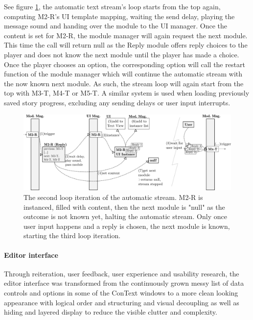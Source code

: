 See figure \ref{fig:loop2}, the automatic text stream's loop starts from the top again, computing M2-R's UI template mapping, waiting the send delay, playing the message sound and handing over the module to the UI manager. Once the content is set for M2-R, the module manager will again request the next module. This time the call will return null as the Reply module offers reply choices to the player and does not know the next module until the player has made a choice. Once the player chooses an option, the corresponding option will call the restart function of the module manager which will continue the automatic stream with the now known next module. 
As such, the stream loop will again start from the top with M3-T, M4-T or M5-T. 
A similar system is used when loading previously saved story progress, excluding any sending delays or user input interrupts. 

\begin{figure}[H]
\centering
\includegraphics[width=\textwidth]{figures/sampleStep2.png}
\caption[Second mod. sys. loop iteration]{The second loop iteration of the automatic stream. M2-R is instanced, filled with content, then the next module is "null" as the outcome is not known yet, halting the automatic stream. Only once user input happens and a reply is chosen, the next module is known, starting the third loop iteration.}\label{fig:loop2}
\end{figure}

\paragraph{Editor interface} Through reiteration, user feedback, user experience and usability research, the editor interface was transformed from the continuously grown messy list of data controls and options in some of the ConText windows to a more clean looking appearance with logical order and structuring and visual decoupling as well as hiding and layered display to reduce the visible clutter and complexity.

